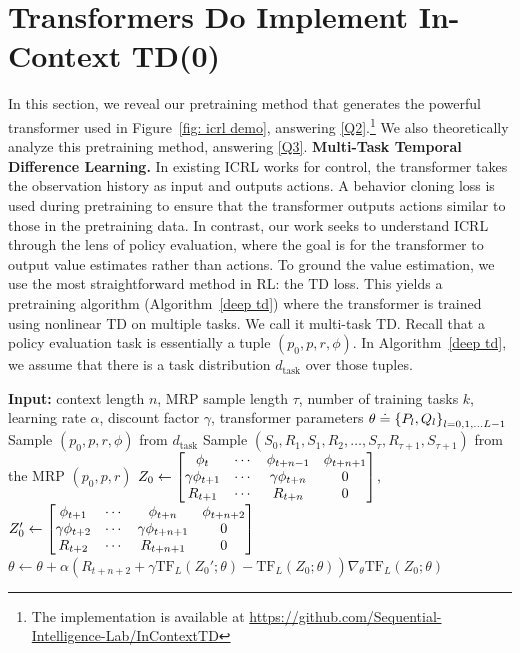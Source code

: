 \documentclass{article}
\newcommand{\tf}{\text{TF}}
\begin{document}
\section{Transformers Do Implement In-Context TD(0)}\label{sec: transformers do implement TD(0)}
In this section,
we reveal our pretraining method that generates the powerful transformer used in Figure~\ref{fig: icrl demo},
answering \ref{Q2}.\footnote{The implementation is available at \url{https://github.com/Sequential-Intelligence-Lab/InContextTD}}
We also theoretically analyze this pretraining method,
answering \ref{Q3}.
\textbf{Multi-Task Temporal Difference Learning.}
In existing ICRL works for control,
the transformer takes the observation history as input and outputs actions.
A behavior cloning loss is used during pretraining to ensure that the transformer outputs actions similar to those in the pretraining data. In contrast, our work seeks to understand ICRL through the lens of policy evaluation, where the goal is for the transformer to output value estimates rather than actions. To ground the value estimation, we use the most straightforward method in RL: the TD loss. This yields a pretraining algorithm (Algorithm~\ref{deep td}) where the transformer is trained using nonlinear TD on multiple tasks. We call it multi-task TD.
Recall that a policy evaluation task is essentially a tuple $(p_0, p, r, \phi)$.
In Algorithm~\ref{deep td}, we assume that there is a task distribution $d_\text{task}$ over those tuples.
\begin{algorithm}[t]
    \caption{\label{deep td} Multi-Task Temporal Difference Learning}
    \begin{algorithmic}[1]
        \STATE \textbf{Input:}
        context length $n$,
        MRP sample length $\tau$,
        number of training tasks $k$,
        learning rate $\alpha$,
        discount factor $\gamma$,
        transformer parameters $\theta \doteq \qty{P_l, Q_l}_{l=0,1,\dots L-1}$
            \STATE Sample $(p_0, p, r, \phi)$ from $d_\text{task}$
            \STATE Sample $(S_0, R_1, S_1, R_2, \dots, S_{\tau}, R_{\tau+1}, S_{\tau+1})$ from the MRP $(p_0, p, r)$
                \STATE $Z_0 \gets \mqty[\phi_t & \cdots & \phi_{t+n-1} & \phi_{t+n+1} \\
                             \gamma \phi_{t+1} & \cdots & \gamma \phi_{t+n} & 0\\
                             R_{t+1} & \cdots & R_{t+n} & 0 ]$,
                             $Z_0' \gets \mqty[\phi_{t+1} & \cdots & \phi_{t+n} & \phi_{t+n+2} \\
                             \gamma \phi_{t+2} & \cdots & \gamma \phi_{t+n+1} & 0\\
                             R_{t+2} & \cdots & R_{t+n+1} & 0 ]$
                \STATE  $\theta \gets \theta + \alpha (R_{t+n+2} + \gamma \tf_L(Z_0'; \theta) - \tf_L(Z_0; \theta)) \nabla_\theta \tf_L(Z_0; \theta)$ 
            \ENDFOR
        \ENDFOR
    \end{algorithmic}
\end{algorithm}
\end{document}
